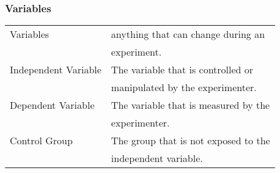 \documentclass[5pt]{article}
\begin{document}
\begin{multicols}{2}
\subsubsection{Variables}
\begin{tabular}{ll}
    Variables                   & anything that can change during an\\
                                & experiment.\\
    Independent Variable        & The variable that is controlled or\\
                                & manipulated by the experimenter.\\
    Dependent Variable          & The variable that is measured by the\\   
                                & experimenter.\\
    Control Group               & The group that is not exposed to the\\
                                & independent variable.\\
\end{tabular}



\end{multicols}
\end{document}
